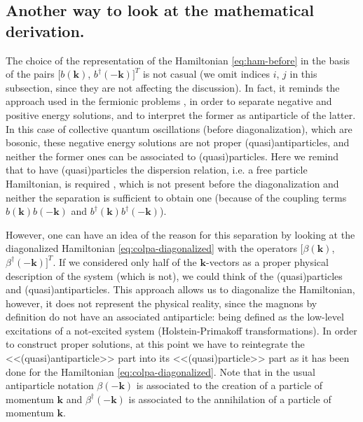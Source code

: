 \documentclass[a4paper,12pt]{article}
\begin{document}
        \subsection{Another way to look at the mathematical derivation.}\label{sec:view}

            The choice of the representation of the Hamiltonian \eqref{eq:ham-before} in the basis of the pairs 
            $[b(\boldsymbol{k})$, $b^{\dag}(-\boldsymbol{k})]^T$ is not casual 
            (we omit indices $i$, $j$ in this subsection, since they are not affecting the discussion).
            In fact, it reminds the approach used in the fermionic problems \cite{source}, 
            in order to separate negative and positive energy solutions, 
            and to interpret the former as antiparticle of the latter. 
            In this case of collective quantum oscillations (before diagonalization), which are bosonic, 
            these negative energy solutions are not proper (quasi)antiparticles, 
            and neither the former ones can be associated to (quasi)particles. 
            Here we remind that to have (quasi)particles the dispersion relation,  
            i.e. a free particle Hamiltonian, is required \cite{source}, which is not present before the diagonalization 
            and neither the separation is sufficient to obtain one (because of the coupling terms 
            $b(\boldsymbol{k})b(-\boldsymbol{k})$ and $b^{\dag}(\boldsymbol{k})b^{\dag}(-\boldsymbol{k})$).

            However, one can have an idea of the reason for this separation by looking at the diagonalized 
            Hamiltonian \eqref{eq:colpa-diagonalized} with the operators $[\beta(\boldsymbol{k})$, $\beta^{\dag}(-\boldsymbol{k})]^T$. 
            If we considered only half of the $\boldsymbol{k}$-vectors as a proper physical description of the system
            (which is not), we could think of the (quasi)particles and (quasi)antiparticles. 
            This approach allows us to diagonalize the Hamiltonian,
            however, it does not represent the physical reality, since the magnons by definition 
            do not have an associated antiparticle: being defined as the low-level excitations of a not-excited system 
            (Holstein-Primakoff transformations). In order to construct proper solutions, at this point we have to reintegrate 
            the <<(quasi)antiparticle>> part into its <<(quasi)particle>> part as it has been done for the Hamiltonian \eqref{eq:colpa-diagonalized}.
            Note that in the usual antiparticle notation $\beta(-\boldsymbol{k})$ is associated to the creation of a particle 
            of momentum $\boldsymbol{k}$ and $\beta^{\dag}(-\boldsymbol{k})$ is associated to the annihilation of 
            a particle of momentum $\boldsymbol{k}$. 
            
\end{document}

